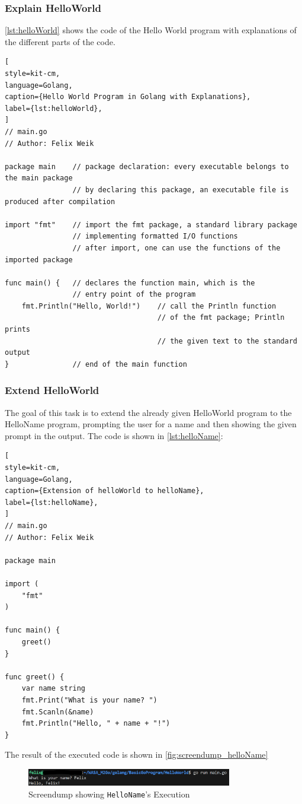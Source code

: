 \subsubsection*{Explain HelloWorld}
\autoref{lst:helloWorld} shows the code of the Hello World program with explanations of the different parts of the code.
\begin{lstlisting}[
style=kit-cm,
language=Golang,
caption={Hello World Program in Golang with Explanations},
label={lst:helloWorld},
]
// main.go 
// Author: Felix Weik

package main    // package declaration: every executable belongs to the main package
                // by declaring this package, an executable file is produced after compilation

import "fmt"    // import the fmt package, a standard library package 
                // implementing formatted I/O functions
                // after import, one can use the functions of the imported package

func main() {   // declares the function main, which is the 
                // entry point of the program
    fmt.Println("Hello, World!")    // call the Println function 
                                    // of the fmt package; Println prints 
                                    // the given text to the standard output
}               // end of the main function

\end{lstlisting}

\subsubsection*{Extend HelloWorld}
The goal of this task is to extend the already given HelloWorld program to the HelloName program, prompting the user for a name and then showing the given prompt in the output.
The code is shown in \autoref{lst:helloName}:
\begin{lstlisting}[
style=kit-cm,
language=Golang,
caption={Extension of helloWorld to helloName},
label={lst:helloName},
]
// main.go
// Author: Felix Weik

package main

import (
    "fmt"
)

func main() {
    greet()
}

func greet() {
    var name string
    fmt.Print("What is your name? ")
    fmt.Scanln(&name)
    fmt.Println("Hello, " + name + "!")
} 
\end{lstlisting}

The result of the executed code is shown in \autoref{fig:screendump_helloName}

\begin{figure}[H]
    \centering
    \includegraphics[width=0.8\textwidth]{figures/goLang/helloWorld/golang_helloWorld_helloName.png}
    \caption{Screendump showing \texttt{HelloName}'s Execution}
    \label{fig:screendump_helloName}
\end{figure}